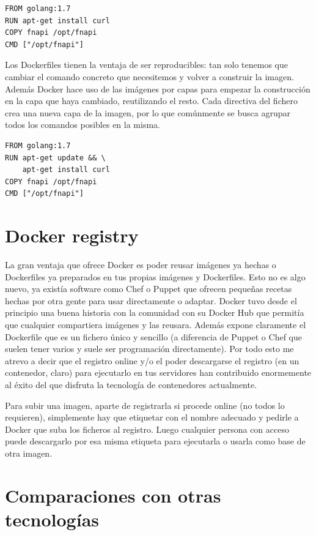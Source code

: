 \begin{verbatim}
FROM golang:1.7
RUN apt-get install curl
COPY fnapi /opt/fnapi
CMD ["/opt/fnapi"]
\end{verbatim}

Los Dockerfiles tienen la ventaja de ser reproducibles: tan solo tenemos que cambiar el comando concreto que necesitemos y volver a construir la imagen. Además Docker hace uso de las imágenes por capas para empezar la construcción en la capa que haya cambiado, reutilizando el resto. Cada directiva del fichero crea una nueva capa de la imagen, por lo que comúnmente se busca agrupar todos los comandos posibles en la misma.
\begin{verbatim}
FROM golang:1.7
RUN apt-get update && \
    apt-get install curl
COPY fnapi /opt/fnapi
CMD ["/opt/fnapi"]
\end{verbatim}

\section{Docker registry}
\label{sec:docker-registry}

La gran ventaja que ofrece Docker es poder reusar imágenes ya hechas o Dockerfiles ya preparados en tus propias imágenes y Dockerfiles. Esto no es algo nuevo, ya existía software como Chef\cite{chef} o Puppet\cite{puppet} que ofrecen pequeñas recetas hechas por otra gente para usar directamente o adaptar. Docker tuvo desde el principio una buena historia con la comunidad con su Docker Hub\cite{dockerhub} que permitía que cualquier compartiera imágenes y las reusara. Además expone claramente el Dockerfile que es un fichero único y sencillo (a diferencia de Puppet o Chef que suelen tener varios y suele ser programación directamente). Por todo esto me atrevo a decir que el registro online y/o el poder descargarse el registro (en un contenedor, claro) para ejecutarlo en tus servidores han contribuido enormemente al éxito del que disfruta la tecnología de contenedores actualmente.

Para subir una imagen, aparte de registrarla si procede online (no todos lo requieren), simplemente hay que etiquetar con el nombre adecuado y pedirle a Docker que suba los ficheros al registro. Luego cualquier persona con acceso puede descargarlo por esa misma etiqueta para ejecutarla o usarla como base de otra imagen.

\section{Comparaciones con otras tecnologías}
\label{sec:docker-compare}

